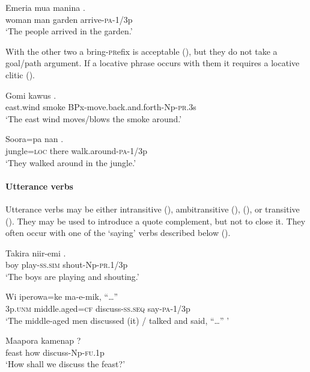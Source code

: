 \ea%
\label{ex:x292}
\gll Emeria mua manina . \\
woman man garden arrive-\textsc{pa}-1/3p \\
\glt`The people arrived in the garden.'
\z

With the other two a bring-\textsc{pr}efix is acceptable (), but they do not take a goal/path argument. If a locative phrase occurs with them it requires a locative clitic ().

\ea%
\label{ex:x293}
\gll Gomi kawus . \\
east.wind smoke BPx-move.back.and.forth-Np-\textsc{pr}.3s \\
\glt`The east wind moves/blows the smoke around.'
\z

\ea%
\label{ex:x436}
\gll Soora=pa nan . \\
jungle=\textsc{loc} there walk.around-\textsc{pa}-1/3p \\
\glt`They walked around in the jungle.'
\z

\paragraph[Utterance verbs]{Utterance verbs}
{}
Utterance verbs may be either intransitive (), ambitransitive (), (), or transitive (). They may be used to introduce a quote complement, but not to close it. They often occur with one of the `saying' verbs described below ().

\ea%
\label{ex:x309}
\gll Takira niir-emi . \\
boy play-\textsc{ss}.\textsc{sim} shout-Np-\textsc{pr}.1/3p \\
\glt`The boys are playing and shouting.'
\z

\ea%
\label{ex:x310}
\gll Wi iperowa=ke  ma-e-mik, ``{\dots}'' \\
3p.\textsc{unm} middle.aged=\textsc{cf} discuss-\textsc{ss}.\textsc{seq} say-\textsc{pa}-1/3p\\
\glt`The middle-aged men discussed (it) / talked and said, ``{\dots}'' '
\z

\ea%
\label{ex:x1927}
\gll Maapora kamenap ? \\
feast how discuss-Np-\textsc{fu}.1p\\
\glt`How shall we discuss the feast?'
\z

